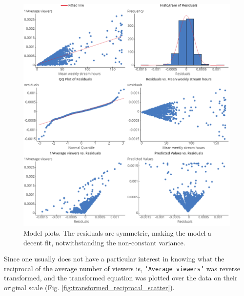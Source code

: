 \documentclass[12pt]{article}
\begin{document}
\begin{figure}[H]
  \centering %
  \includegraphics[scale=0.5]{../StatCrunch_Results/reciprocal/stream_time_reciprocal_avg_viewers_plots}
  \captionsetup{justification=centering, singlelinecheck=false, margin=2cm}
  \caption[Average Viewers Predicted by Stream Hours]{Model plots. The residuals are symmetric, making the model a decent fit, notwithstanding the non-constant variance.}
  \label{fig:stream_time_reciprocal_avg_viewers}
\end{figure}

\noindent Since one usually does not have a particular interest in knowing what the reciprocal of the average number of viewers is, \texttt{`Average viewers'} was reverse transformed, and the transformed equation was plotted over the data on their original scale (Fig. \ref{fig:transformed_reciprocal_scatter}).
\end{document}
